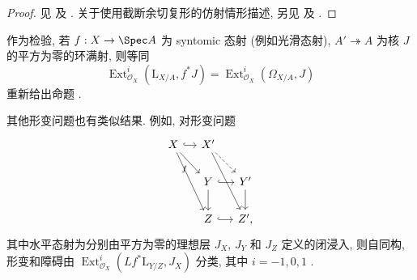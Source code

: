 \begin{proof}
见 \cite[III.$2.1.7$]{Ill71} 及 \cite[Tag 08UZ]{SP}. 关于使用截断余切复形的仿射情形描述, 另见 \cite[$4.2.5$]{LS67} 及 \cite[定理 $10.1$]{Har10}.
\end{proof}
作为检验, 若 $f:X\to\Spec A$ 为 syntomic 态射 (例如光滑态射), $A'\twoheadrightarrow A$ 为核 $J$ 的平方为零的环满射, 则等同
\[
\operatorname{Ext}_{\mathcal O_X}^i(\mathrm L_{X/A},f^*J)=\operatorname{Ext}_{\mathcal O_X}^i(\Omega_{X/A},J)
\]
重新给出命题 .
\begin{remark}\label{src:C.3.7}
其他形变问题也有类似结果. 例如, 对形变问题
\[
\begin{tikzcd}[column sep=small]
X\arrow[r,hook]\arrow[dr,"f"']\arrow[ddr]&X'\arrow[dr,dashed]\arrow[ddr]&\\
&Y\arrow[r,hook]\arrow[d]&Y'\arrow[d]\\
&Z\arrow[r,hook]&Z',
\end{tikzcd}
\]
其中水平态射为分别由平方为零的理想层 $J_X$, $J_Y$ 和 $J_Z$ 定义的闭浸入, 则自同构, 形变和障碍由 $\operatorname{Ext}_{\mathcal O_X}^i(Lf^*\mathrm L_{Y/Z},J_X)$ 分类, 其中 $i=-1,0,1$ \cite[III.$2.2.4$]{Ill71}.
\end{remark}
